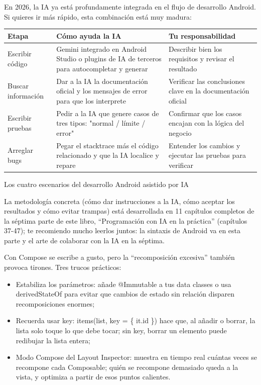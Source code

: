 
En 2026, la IA ya está profundamente integrada en el flujo de desarrollo Android. Si quieres ir más rápido, esta combinación está muy madura:

\begin{center}
\begin{tabularx}{\linewidth}{|X|X|X|}
\hline
\textbf{Etapa} & \textbf{Cómo ayuda la IA} & \textbf{Tu responsabilidad} \tabularnewline
\hline
Escribir código & Gemini integrado en Android Studio o plugins de IA de terceros para autocompletar y generar & Describir bien los requisitos y revisar el resultado \tabularnewline
Buscar información & Dar a la IA la documentación oficial y los mensajes de error para que los interprete & Verificar las conclusiones clave en la documentación oficial \tabularnewline
Escribir pruebas & Pedir a la IA que genere casos de tres tipos: "normal / límite / error" & Confirmar que los casos encajan con la lógica del negocio \tabularnewline
Arreglar bugs & Pegar el stacktrace más el código relacionado y que la IA localice y repare & Entender los cambios y ejecutar las pruebas para verificar \tabularnewline
\hline
\end{tabularx}
\end{center}

\begin{center}\small\color{gray}Los cuatro escenarios del desarrollo Android asistido por IA\end{center}

La metodología concreta (cómo dar instrucciones a la IA, cómo aceptar los resultados y cómo evitar trampas) está desarrollada en 11 capítulos completos de la séptima parte de este libro, “Programación con IA en la práctica” (capítulos 37-47); te recomiendo mucho leerlos juntos: la sintaxis de Android va en esta parte y el arte de colaborar con la IA en la séptima.


Con Compose se escribe a gusto, pero la “recomposición excesiva” también provoca tirones. Tres trucos prácticos:

\begin{itemize}
  \item Estabiliza los parámetros: añade @Immutable a tus data classes o usa derivedStateOf para evitar que cambios de estado sin relación disparen recomposiciones enormes;
  \item Recuerda usar key: items(list, key = \{ it.id \}) hace que, al añadir o borrar, la lista solo toque lo que debe tocar; sin key, borrar un elemento puede redibujar la lista entera;
  \item Modo Compose del Layout Inspector: muestra en tiempo real cuántas veces se recompone cada Composable; quién se recompone demasiado queda a la vista, y optimiza a partir de esos puntos calientes.
\end{itemize}

